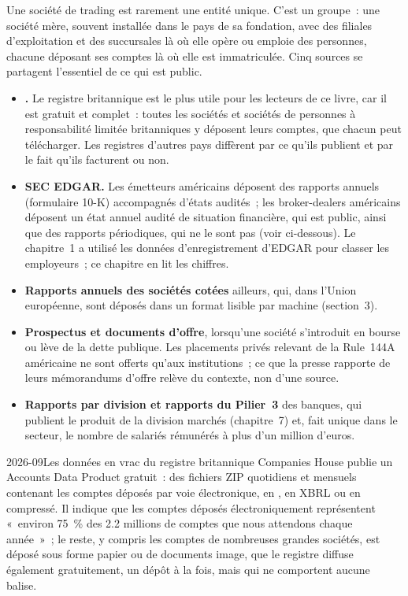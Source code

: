 Une société de trading est rarement une entité unique. C'est un groupe~: une société mère, souvent installée dans le pays de sa fondation, avec des filiales d'exploitation
et des succursales là où elle opère ou emploie des personnes, chacune déposant ses comptes là où elle est immatriculée. Cinq
sources se partagent l'essentiel de ce qui est public.
\begin{itemize}
\item \textbf{.} Le registre britannique est le plus utile pour les lecteurs de ce livre, car il est gratuit et
complet~: toutes les sociétés et sociétés de personnes à responsabilité limitée britanniques y déposent leurs comptes, que chacun peut télécharger. Les registres
d'autres pays diffèrent par ce qu'ils publient et par le fait qu'ils facturent ou non.
\item \textbf{SEC EDGAR.} Les émetteurs américains déposent des rapports annuels (formulaire 10-K) accompagnés d'états audités~; les broker-dealers américains déposent un
état annuel audité de situation financière, qui est public, ainsi que des rapports périodiques, qui ne le sont pas (voir ci-dessous).
Le chapitre~1 a utilisé les données d'enregistrement d'EDGAR pour classer les employeurs~; ce chapitre en lit les chiffres.
\item \textbf{Rapports annuels des sociétés cotées} ailleurs, qui, dans l'Union européenne, sont déposés dans un format lisible
par machine (section~3).
\item \textbf{Prospectus et documents d'offre}, lorsqu'une société s'introduit en bourse ou lève de la dette publique. Les placements privés
relevant de la Rule~144A américaine ne sont offerts qu'aux institutions~; ce que la presse rapporte de leurs mémorandums d'offre relève du contexte, non
d'une source.
\item \textbf{Rapports par division et rapports du Pilier~3} des banques, qui publient le produit de la division marchés (chapitre~7) et,
fait unique dans le secteur, le nombre de salariés rémunérés à plus d'un million d'euros.
\end{itemize}

\begin{dated}{2026-09}{Les données en vrac du registre britannique}\label{dat:in:reading-a-trading-firms-accounts:registry}
Companies House publie un Accounts Data Product gratuit~: des fichiers ZIP quotidiens et mensuels contenant les comptes déposés par voie électronique,
en , en XBRL ou en  compressé. Il indique que les comptes déposés électroniquement représentent «~environ 75~\% des 2.2
millions de comptes que nous attendons chaque année~»~; le reste, y compris les comptes de nombreuses grandes sociétés, est déposé
sous forme papier ou de documents image, que le registre diffuse également gratuitement, un dépôt à la fois, mais qui ne comportent aucune balise.
\end{dated}

